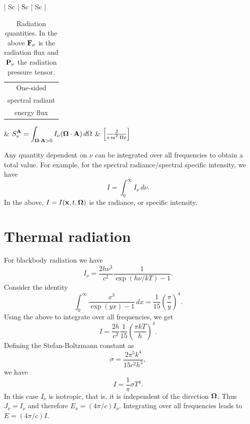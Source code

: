 \documentclass[a4paper,11pt]{report}
\begin{document}
\begin{table}[ht]
\begin{tabular} { | Sc | Sc | Sc |}
        \hline
        
        \begin{tabular}{c} One-sided \\ spectral radiant \\ energy flux \end{tabular} 
        & $ \displaystyle S_\nu^{\mathbf{A}} = \int_{\bm \Omega \cdot \mathbf{A} > 0} I_\nu (\bm \Omega \cdot \mathbf{A}) \, d\Omega $ 
        & $ \left [ \frac{\text{J}}{\text{s$\cdot$m\textsuperscript{2}$\cdot$Hz}} \right ]$ \\

        \hline
    \end{tabular}
    \caption{Radiation quantities. In the above $\mathbf{F}_\nu$ is the radiation flux and $\mathbf{P}_\nu$ the radiation pressure tensor.}
    \label{tab:definitions}
\end{table}

Any quantity dependent on $\nu$ can be integrated over all frequencies to obtain a total value. For example, for the spectral radiance/spectral specific intensity, we have
\begin{equation}
    I = \int_0^\infty I_\nu \, d\nu.
\end{equation}
In the above, $I = I(\mathbf{x}, t, \bm \Omega)$ is the radiance, or specific intensity. 

\chapter{Thermal radiation}
For blackbody radiation we have
\begin{equation}
    I_\nu = \frac{2h\nu^3}{c^2} \frac{1}{\exp(h\nu/kT) - 1}.
\end{equation}
Consider the identity 
\begin{equation}
    \int_0^\infty \frac{x^3}{\exp(yx) - 1} \, dx = \frac{1}{15} \left ( \frac{\pi}{y} \right )^4.
\end{equation}
Using the above to integrate over all frequencies, we get
\begin{equation}
    I = \frac{2h}{c^2} \frac{1}{15} \left ( \frac{ \pi kT}{h} \right )^4.
\end{equation}
Defining the Stefan-Boltzmann constant as
\begin{equation}
    \sigma = \frac{2 \pi^5 k^4}{15 c^2 h^3},
\end{equation}
we have
\begin{equation}
    I = \frac{1}{\pi} \sigma T^4.
\end{equation}
In this case $I_\nu$ is isotropic, that is, it is independent of the direction $\bm \Omega$. Thus $J_\nu = I_\nu$ and therefore $E_\nu = (4\pi/c) I_\nu$. Integrating over all frequencies leads to $E = (4\pi/c) I$.
\end{document}
